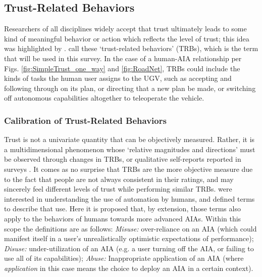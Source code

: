 \subsection{Trust-Related Behaviors} \label{sec:trbs}
Researchers of all disciplines widely accept that trust ultimately leads to some kind of meaningful behavior or action which reflects the level of trust; this idea was highlighted by \citet{Lewis1985-pr}.  \citet{McKnight2001-fa} call these `trust-related behaviors' (TRBs), which is the term that will be used in this survey. In the case of a human-AIA relationship per Figs. \ref{fig:SimpleTrust_one_way} and \ref{fig:RoadNet}, TRBs could include the kinds of tasks the human user assigns to the UGV, such as accepting and following through on its plan, or directing that a new plan be made, or switching off autonomous capabilities altogether to teleoperate the vehicle. 

\subsubsection{Calibration of Trust-Related Behaviors}
    Trust is not a univariate quantity that can be objectively measured. Rather, it is a multidimensional phenomenon whose `relative magnitudes and directions' must be observed through changes in TRBs, or qualitative self-reports reported in surveys \cite{Muir1996-gt}. It comes as no surprise that TRBs are the more objective measure due to the fact that people are not always consistent in their ratings, and may sincerely feel different levels of trust while performing similar TRBs. \citet{Parasuraman1997-co} were interested in understanding the use of automation by humans, and defined terms to describe that use. Here it is proposed that, by extension, those terms also apply to the behaviors of humans towards more advanced AIAs. Within this scope the definitions are as follows: \textit{Misuse:} over-reliance on an AIA (which could manifest itself in a user's unrealistically optimistic expectations of performance); \textit{Disuse:} under-utilization of an AIA (e.g. a user turning off the AIA, or failing to use all of its capabilities); \textit{Abuse:} Inappropriate application of an AIA (where \emph{application} in this case means the choice to deploy an AIA in a certain context).


